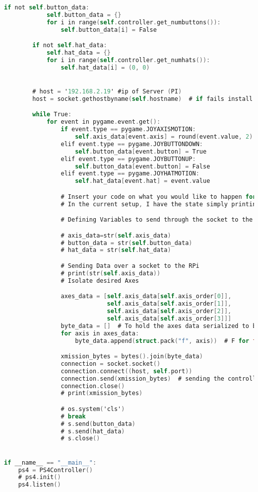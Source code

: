 \begin{lstlisting}[language=C,caption= {Control Signal and Client Script},label={lst:ps4_controller.py}]
        if not self.button_data:
            self.button_data = {}
            for i in range(self.controller.get_numbuttons()):
                self.button_data[i] = False

        if not self.hat_data:
            self.hat_data = {}
            for i in range(self.controller.get_numhats()):
                self.hat_data[i] = (0, 0)


        # host = '192.168.2.19' #ip of Server (PI)
        host = socket.gethostbyname(self.hostname)  # if fails install samba on pi and reboot

        while True:
            for event in pygame.event.get():
                if event.type == pygame.JOYAXISMOTION:
                    self.axis_data[event.axis] = round(event.value, 2)
                elif event.type == pygame.JOYBUTTONDOWN:
                    self.button_data[event.button] = True
                elif event.type == pygame.JOYBUTTONUP:
                    self.button_data[event.button] = False
                elif event.type == pygame.JOYHATMOTION:
                    self.hat_data[event.hat] = event.value

                # Insert your code on what you would like to happen for each event here!
                # In the current setup, I have the state simply printing out to the screen.

                # Defining Variables to send through the socket to the RPi, need to be strings

                # axis_data=str(self.axis_data)
                # button_data = str(self.button_data)
                # hat_data = str(self.hat_data)

                # Sending Data over a socket to the RPi
                # print(str(self.axis_data))
                # Isolate desired Axes

                axes_data = [self.axis_data[self.axis_order[0]],
                             self.axis_data[self.axis_order[1]],
                             self.axis_data[self.axis_order[2]],
                             self.axis_data[self.axis_order[3]]]
                byte_data = []  # To hold the axes data serialized to bytes
                for axis in axes_data:
                    byte_data.append(struct.pack("f", axis))  # F for float

                xmission_bytes = bytes().join(byte_data)
                connection = socket.socket()
                connection.connect((host, self.port))
                connection.send(xmission_bytes)  # sending the controller data over the port
                connection.close()
                # print(xmission_bytes)

                # os.system('cls')
                # break
                # s.send(button_data)
                # s.send(hat_data)
                # s.close()


if __name__ == "__main__":
    ps4 = PS4Controller()
    # ps4.init()
    ps4.listen()


\end{lstlisting}



\newpage




